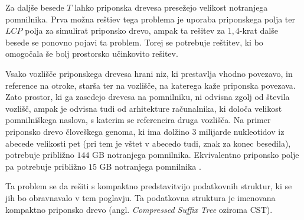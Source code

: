 Za daljše besede $T$ lahko priponska drevesa presežejo velikost notranjega pomnilnika. Prva možna reštiev tega problema je uporaba priponskega polja ter $LCP$ polja za simulirat priponsko drevo, ampak ta rešitev za $1,4$-krat dalše besede se ponovno pojavi ta problem. Torej se potrebuje reštitev, ki bo omogočala še bolj prostorsko učinkovito rešitev. 

Vsako vozlišče priponskega drevesa hrani niz, ki prestavlja vhodno povezavo, in reference na otroke, starša ter na vozlišče, na katerega kaže priponska povezava. Zato prostor, ki ga zasedejo drevesa na pomnilniku, ni odvisna zgolj od števila vozlišč, ampak je odvisna tudi od arhitekture računalnika, ki določa velikost pomnilniškega naslova, s katerim se referencira druga vozlišča. Na primer priponsko drevo človeškega genoma, ki ima dolžino 3 milijarde nukleotidov iz abecede velikosti pet (pri tem je vštet v abecedo tudi, znak za konec besedila), potrebuje približno $144$ GB notranjega pomnilnika. Ekvivalentno priponsko polje pa potrebuje približno $15$ GB notranjega pomnilnika \cite{GENOMEKNOWLEDGEHUB-2024-10-30}.

Ta problem se da rešiti s kompaktno predstavitvijo podatkovnih struktur, ki se jih bo obravnavalo v tem poglavju. Ta podatkovna struktura je imenovana kompaktno priponsko drevo (angl. \textit{Compressed Suffix Tree} oziroma CST).


